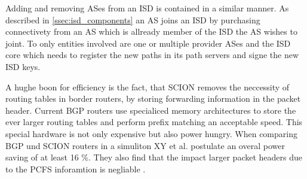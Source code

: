 \documentclass[../eva1_scion.tex]{subfiles}
\begin{document}
    Adding and removing ASes from an ISD is contained in a similar manner. As described in \ref{ssec:isd_components} an AS joins an ISD by purchasing connectivety from an AS which is allready member of the ISD the AS wishes to joint. To only entities involved are one or multiple provider ASes and the ISD core which needs to register the new paths in its path servers and signe the new ISD keys.

    A hughe boon for efficiency is the fact, that SCION removes the neccessity of routing tables in border routers, by storing forwarding information in the packet header. Current BGP routers use specialiced memory architectures to store the ever larger routing tables and perform prefix matching an acceptable speed. This special hardware is not only expensive but also power hungry. When comparing BGP und SCION routers in a simuliton XY et al. postulate an overal power saving of at least 16 \%. They also find that the impact larger packet headers due to the PCFS inforamtion is negliable \cite{scion_power}.
\end{document}
